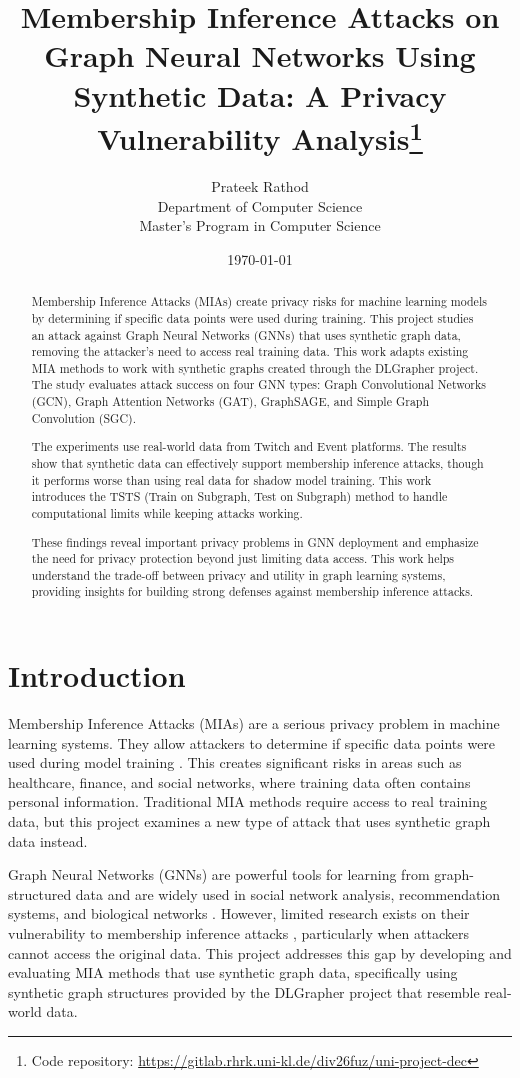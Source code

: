 \documentclass{article}
\title{Membership Inference Attacks on Graph Neural Networks Using Synthetic Data: A Privacy Vulnerability Analysis\footnote{Code repository: \url{https://gitlab.rhrk.uni-kl.de/div26fuz/uni-project-dec}}}
\author{Prateek Rathod\\
Department of Computer Science\\
Master's Program in Computer Science}
\date{\today}
\begin{document}
\maketitle

\begin{abstract}
Membership Inference Attacks (MIAs) create privacy risks for machine learning models by determining if specific data points were used during training. This project studies an attack against Graph Neural Networks (GNNs) that uses synthetic graph data, removing the attacker's need to access real training data. This work adapts existing MIA methods to work with synthetic graphs created through the DLGrapher project\cite{dlgrapher2022}. The study evaluates attack success on four GNN types: Graph Convolutional Networks (GCN), Graph Attention Networks (GAT), GraphSAGE, and Simple Graph Convolution (SGC). 

The experiments use real-world data from Twitch and Event platforms. The results show that synthetic data can effectively support membership inference attacks, though it performs worse than using real data for shadow model training. This work introduces the TSTS (Train on Subgraph, Test on Subgraph) method to handle computational limits while keeping attacks working. 

These findings reveal important privacy problems in GNN deployment and emphasize the need for privacy protection beyond just limiting data access. This work helps understand the trade-off between privacy and utility in graph learning systems, providing insights for building strong defenses against membership inference attacks.
\end{abstract}

\section{Introduction}
Membership Inference Attacks (MIAs) are a serious privacy problem in machine learning systems. They allow attackers to determine if specific data points were used during model training \cite{shokri2017membership}. This creates significant risks in areas such as healthcare, finance, and social networks, where training data often contains personal information. Traditional MIA methods require access to real training data, but this project examines a new type of attack that uses synthetic graph data instead.

Graph Neural Networks (GNNs) are powerful tools for learning from graph-structured data and are widely used in social network analysis, recommendation systems, and biological networks \cite{kipf2017semi, velickovic2018graph, hamilton2017inductive}. However, limited research exists on their vulnerability to membership inference attacks \cite{he2021membership}, particularly when attackers cannot access the original data. This project addresses this gap by developing and evaluating MIA methods that use synthetic graph data, specifically using synthetic graph structures provided by the DLGrapher project \cite{dlgrapher2022} that resemble real-world data.
\end{document}

